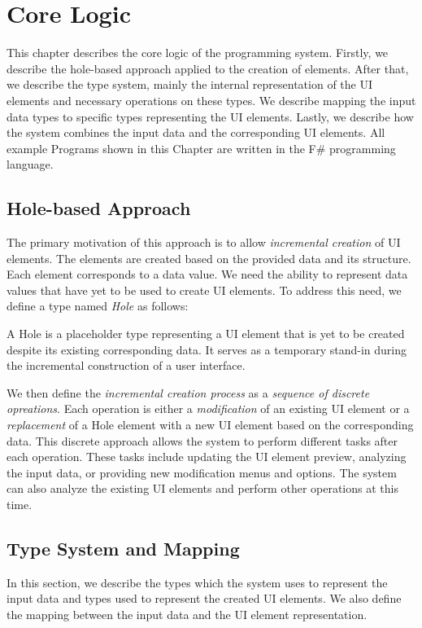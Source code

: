 \chapter{Core Logic}
\label{chap:corelogic}


This chapter describes the core logic of the programming system.
Firstly, we describe the hole-based approach applied to the creation of elements.
After that, we describe the type system, mainly the internal representation of the UI elements and necessary operations on these types.
We describe mapping the input data types to specific types representing the UI elements.
Lastly, we describe how the system combines the input data and the corresponding UI elements.
All example Programs shown in this Chapter are written in the F\# programming language.

\section{Hole-based Approach}
\label{sec:hole-based}
The primary motivation of this approach is to allow \emph{incremental creation} of UI elements.
The elements are created based on the provided data and its structure.
Each element corresponds to a data value.
We need the ability to represent data values that have yet to be used to create UI elements.
To address this need, we define a type named \emph{Hole} as follows:
\begin{defn}
	A Hole is a placeholder type representing a UI element that is yet to be created despite its existing corresponding data. It serves as a temporary stand-in during the incremental construction of a user interface.
\end{defn}

We then define the \emph{incremental creation process} as a \emph{sequence of discrete opreations}.
Each operation is either a \emph{modification} of an existing UI element or a \emph{replacement} of a Hole element with a new UI element based on the corresponding data.
This discrete approach allows the system to perform different tasks after each operation.
These tasks include updating the UI element preview, analyzing the input data, or providing new modification menus and options.
The system can also analyze the existing UI elements and perform other operations at this time.


\section{Type System and Mapping}
\label{sec:types}
In this section, we describe the types which the system uses to represent the input data and types used to represent the created UI elements.
We also define the mapping between the input data and the UI element representation.


